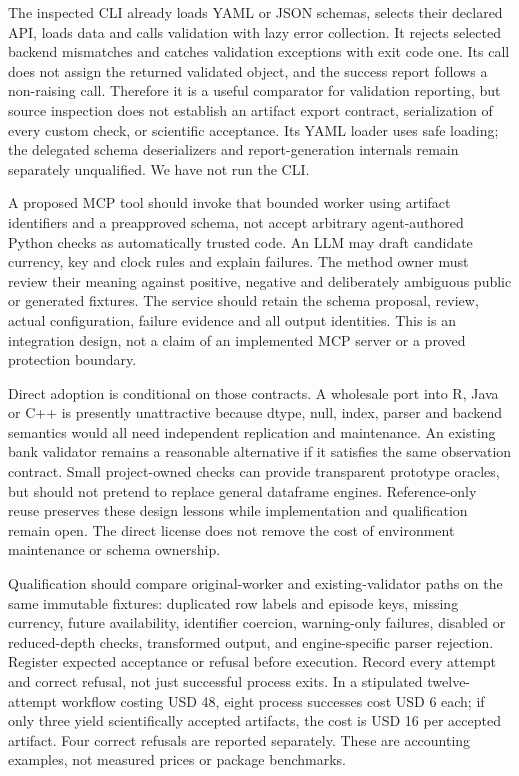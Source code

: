 The inspected CLI already loads YAML or JSON schemas, selects their declared
API, loads data and calls validation with lazy error collection. It rejects
selected backend mismatches and catches validation exceptions with exit code
one. Its call does not assign the returned validated object, and the success
report follows a non-raising call. Therefore it is a useful comparator for
validation reporting, but source inspection does not establish an artifact
export contract, serialization of every custom check, or scientific acceptance.
Its YAML loader uses safe loading; the delegated schema deserializers and
report-generation internals remain separately unqualified. We have not run
the CLI.~\citep{exec24_pandera_source}

A proposed MCP tool should invoke that bounded worker using artifact identifiers
and a preapproved schema, not accept arbitrary agent-authored Python checks as
automatically trusted code. An LLM may draft candidate currency, key and clock
rules and explain failures. The method owner must review their meaning against
positive, negative and deliberately ambiguous public or generated fixtures.
The service should retain the schema proposal, review, actual configuration,
failure evidence and all output identities. This is an integration design,
not a claim of an implemented MCP server or a proved protection boundary.

Direct adoption is conditional on those contracts. A wholesale port into R,
Java or C++ is presently unattractive because dtype, null, index, parser and
backend semantics would all need independent replication and maintenance.
An existing bank validator remains a reasonable alternative if it satisfies the
same observation contract. Small project-owned checks can provide transparent
prototype oracles, but should not pretend to replace general dataframe engines.
Reference-only reuse preserves these design lessons while implementation and
qualification remain open. The direct license does not remove the cost of
environment maintenance or schema ownership.~\citep{exec24_pandera_source}

Qualification should compare original-worker and existing-validator paths on
the same immutable fixtures: duplicated row labels and episode keys, missing
currency, future availability, identifier coercion, warning-only failures,
disabled or reduced-depth checks, transformed output, and engine-specific
parser rejection. Register expected acceptance or refusal before execution.
Record every attempt and correct refusal, not just successful process exits.
In a stipulated twelve-attempt workflow costing USD 48, eight process successes
cost USD 6 each; if only three yield scientifically accepted artifacts, the cost
is USD 16 per accepted artifact. Four correct refusals are reported separately.
These are accounting examples, not measured prices or package benchmarks.
\citep{exec24_pandera_reference}

